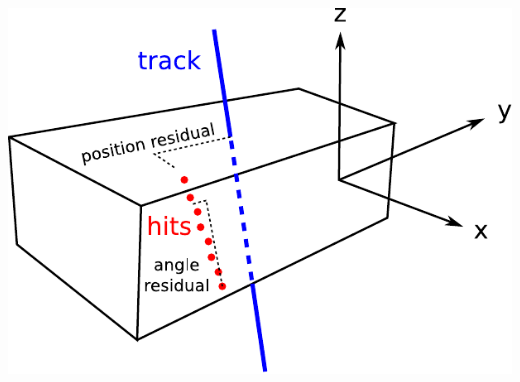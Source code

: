 \documentclass[compress]{beamer}
\begin{document}
\begin{frame}
\begin{columns}
\vspace{-1 cm}
\includegraphics[width=\linewidth]{coordinates.pdf}

\vspace{1 cm}
\end{columns}
\end{frame}
\end{document}
